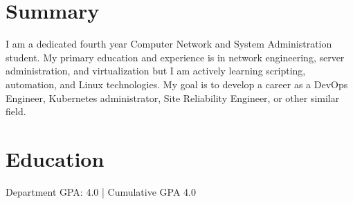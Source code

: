 \documentclass[]{deedy-resume-reversed}
\begin{document}
\begin{minipage}[t]{0.39\textwidth}



\section{Summary}

I am a dedicated fourth year Computer Network and System Administration student. My primary education and experience is in network \newline engineering, server administration, and \newline virtualization but I am actively learning scripting, automation, and Linux technologies. My goal is to develop a career as a DevOps Engineer, \newline Kubernetes administrator, Site Reliability \newline Engineer, or other similar field.

\sectionsep



\section{Education}

Department GPA: 4.0 | Cumulative GPA 4.0
\sectionsep



\end{minipage}
\end{document}
